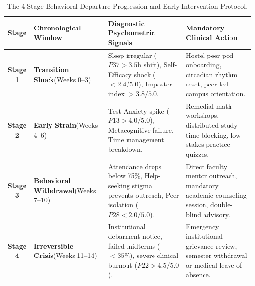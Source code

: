 \documentclass[10pt,a4paper]{article}
\begin{document}
\begin{table}[h!]
\centering
\small
\renewcommand{\arraystretch}{1.2}
\begin{tabularx}{\textwidth}{cp{2.8cm}p{4.5cm}>{\raggedright\arraybackslash}X}
\toprule
\textbf{Stage} & \textbf{Chronological Window} & \textbf{Diagnostic Psychometric Signals} & \textbf{Mandatory Clinical Action} \\
\midrule
\rowcolor{BlueLight} \textbf{Stage 1} & \textbf{Transition Shock}\newline (Weeks 0--3) &
Sleep irregular ($P37 > 3.5$h shift), Self-Efficacy shock ($< 2.4/5.0$), Imposter index $> 3.8/5.0$. &
Hostel peer pod onboarding, circadian rhythm reset, peer-led campus orientation. \\
\rowcolor{GoldBG} \textbf{Stage 2} & \textbf{Early Strain}\newline (Weeks 4--6) &
Test Anxiety spike ($P13 > 4.0/5.0$), Metacognitive failure, Time management breakdown. &
Remedial math workshops, distributed study time blocking, low-stakes practice quizzes. \\
\rowcolor{RedLight} \textbf{Stage 3} & \textbf{Behavioral Withdrawal}\newline (Weeks 7--10) &
Attendance drops below 75\%, Help-seeking stigma prevents outreach, Peer isolation ($P28 < 2.0/5.0$). &
Direct faculty mentor outreach, mandatory academic counseling session, double-blind advisory. \\
\rowcolor{CanvasBorder} \textbf{Stage 4} & \textbf{Irreversible Crisis}\newline (Weeks 11--14) &
Institutional debarment notice, failed midterms ($< 35\%$), severe clinical burnout ($P22 > 4.5/5.0$). &
Emergency institutional grievance review, semester withdrawal or medical leave of absence. \\
\bottomrule
\end{tabularx}
\caption{The 4-Stage Behavioral Departure Progression and Early Intervention Protocol.}
\end{table}
\end{document}
